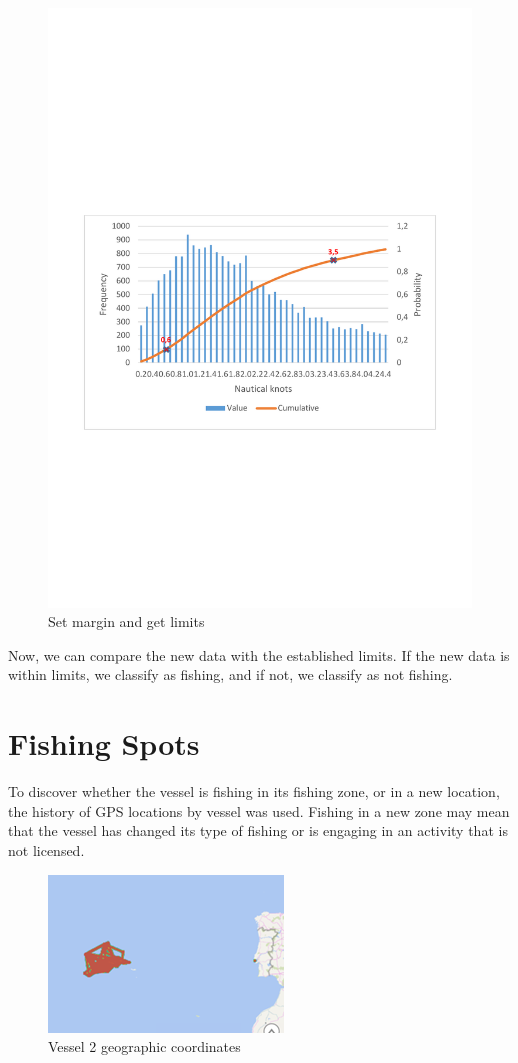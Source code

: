 \begin{figure}[H]
    \centering
    \includegraphics[trim=300 250 300 300,height=0.5\linewidth]{Chapters/img/hc_8.pdf}
    \caption{Set margin and get limits}
    \label{fig:app_b_8}
\end{figure}


Now, we can compare the new data with the established limits. If the new data is within limits, we classify as fishing, and if not, we classify as not fishing.



\section{Fishing Spots} %
\label{sub:fishing_spots}

To discover whether the vessel is fishing in its fishing zone, or in a new location, the history of GPS locations by vessel was used.
Fishing in a new zone may mean that the vessel has changed its type of fishing or is engaging in an activity that is not licensed.


\begin{figure}[]
\centering
\includegraphics[width=0.8\linewidth]{Chapters/img/gps_vessel2.png}
\caption{Vessel 2 geographic coordinates}
\label{fig:gps_vessel2}
\end{figure}

